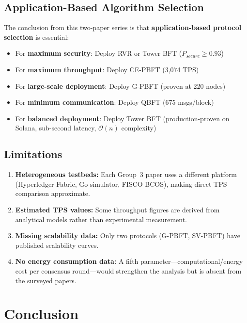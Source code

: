 \documentclass[10pt,twocolumn,letterpaper]{article}
\begin{document}
\subsection{Application-Based Algorithm Selection}

The conclusion from this two-paper series is that \textbf{application-based protocol selection} is essential:
\begin{itemize}[leftmargin=*]
    \item For \textbf{maximum security}: Deploy RVR or Tower BFT ($P_{secure} \geq 0.93$)
    \item For \textbf{maximum throughput}: Deploy CE-PBFT (3,074 TPS)
    \item For \textbf{large-scale deployment}: Deploy G-PBFT (proven at 220 nodes)
    \item For \textbf{minimum communication}: Deploy QBFT (675 msgs/block)
    \item For \textbf{balanced deployment}: Deploy Tower BFT (production-proven on Solana, sub-second latency, $\mathcal{O}(n)$ complexity)
\end{itemize}

\subsection{Limitations}

\begin{enumerate}[leftmargin=*]
    \item \textbf{Heterogeneous testbeds:} Each Group~3 paper uses a different platform (Hyperledger Fabric, Go simulator, FISCO BCOS), making direct TPS comparison approximate.
    \item \textbf{Estimated TPS values:} Some throughput figures are derived from analytical models rather than experimental measurement.
    \item \textbf{Missing scalability data:} Only two protocols (G-PBFT, SV-PBFT) have published scalability curves.
    \item \textbf{No energy consumption data:} A fifth parameter---computational/energy cost per consensus round---would strengthen the analysis but is absent from the surveyed papers.
\end{enumerate}

\section{Conclusion}
\label{sec:conclusion}
\end{document}
